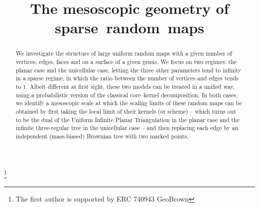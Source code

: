 \documentclass[JEP,XML,SOM,Unicode,NoFloatCountersInSection,NoEqCountersInSection]{cedram}
\theoremstyle{plain}
\theoremstyle{definition}
\theoremstyle{remark}
\begin{document}
\frontmatter
\title[The mesoscopic geometry of sparse random maps]{The mesoscopic geometry of sparse~random~maps}

\author[\initial{N.} \lastname{Curien}]{ }
\address{Département de Mathématique, Université Paris-Saclay, Faculté des Sciences d'Orsay\\
Orsay, France}

\author[\initial{I.} \lastname{Kortchemski}]{ }
\address{CNRS et Centre de Mathématiques Appliquées, École Polytechnique\\
Palaiseau, France}

\author[\initial{C.} \lastname{Marzouk}]{ }
\address{CNRS et Centre de Mathématiques Appliquées, École Polytechnique\\
Palaiseau, France}

\thanks{The first author is supported by ERC 740943 GeoBrown}




\begin{abstract}
We investigate the structure of large uniform random maps with a given number of vertices, edges, faces and on a surface of a given genus. We focus on two regimes: the planar case and the unicellular case, letting the three other parameters tend to infinity in a sparse regime, in which the ratio between the number of vertices and edges tends to $1$. Albeit different at first sight, these two models can be treated in a unified way, using a probabilistic version of the classical core--kernel decomposition.
In both cases, we identify a mesoscopic scale at which the scaling limits of these random maps can be obtained by first taking the local limit of their kernels (or scheme) -- which turns out to be the dual of the Uniform Infinite Planar Triangulation in the planar case and the infinite three-regular tree in the unicellular case -- and then replacing each edge by an independent (mass-biased) Brownian tree with two marked points.
\end{abstract}
\end{document}

